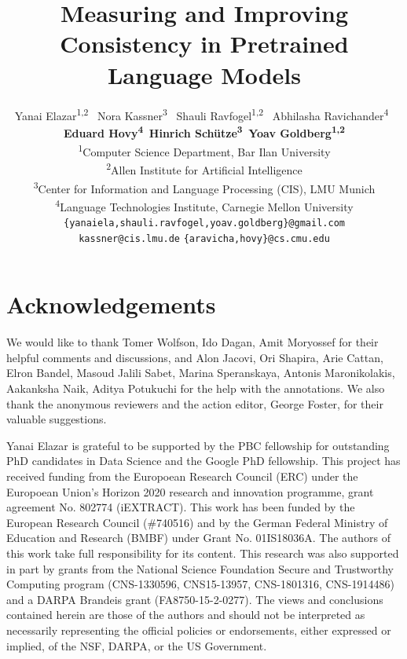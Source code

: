 \documentclass[11pt,a4paper]{article}
\title{Measuring and Improving Consistency in Pretrained Language Models}
\author{Yanai Elazar\textsuperscript{1,2} \,
 Nora Kassner\textsuperscript{3} \,
 Shauli Ravfogel\textsuperscript{1,2} \, 
 Abhilasha Ravichander\textsuperscript{4} \, \\
 {\bf Eduard Hovy\textsuperscript{4}\, 
 \bf Hinrich Sch\"utze\textsuperscript{3}\, 
 Yoav Goldberg\textsuperscript{1,2}}\\
\textsuperscript{1}Computer Science Department, Bar Ilan University \\
\textsuperscript{2}Allen Institute for Artificial Intelligence \\
\textsuperscript{3}Center for Information and Language Processing (CIS), LMU Munich\\
\textsuperscript{4}Language Technologies Institute, Carnegie Mellon University \\
  {\tt  \{yanaiela,shauli.ravfogel,yoav.goldberg\}@gmail.com}\\
  {\tt kassner@cis.lmu.de} 
  {\tt \{aravicha,hovy\}@cs.cmu.edu} 
  }
\date{}
\begin{document}
\maketitle

\begin{abstract}

\end{abstract}


% 












% 










\section*{Acknowledgements}
We would like to thank Tomer Wolfson, Ido Dagan, Amit Moryossef for their helpful comments and discussions, and Alon Jacovi, Ori Shapira, Arie Cattan, Elron Bandel, Masoud Jalili Sabet,  Marina Speranskaya, Antonis Maronikolakis, Aakanksha Naik, Aditya Potukuchi for the help with the annotations.
We also thank the anonymous reviewers and the action editor, George Foster, for their valuable suggestions.


Yanai Elazar is grateful to be supported by the PBC fellowship for outstanding PhD candidates in Data Science and the Google PhD fellowship.
This project has received funding from the Europoean Research Council (ERC) under the Europoean Union's Horizon 2020 research and innovation programme, grant agreement No. 802774 (iEXTRACT).
This work has been funded by the European Research Council (\#740516) and by the German Federal Ministry of Education
and Research (BMBF) under Grant No. 01IS18036A. The authors of this
work take full responsibility for its content. This research was also supported in part by grants from the National Science Foundation Secure and Trustworthy Computing program (CNS-1330596, CNS15-13957, CNS-1801316, CNS-1914486) and a DARPA Brandeis grant (FA8750-15-2-0277). The views and conclusions contained herein are those of the authors and should not be interpreted as necessarily representing the official policies or endorsements, either expressed or implied, of the NSF, DARPA, or the US Government.




\appendix


\end{document}
